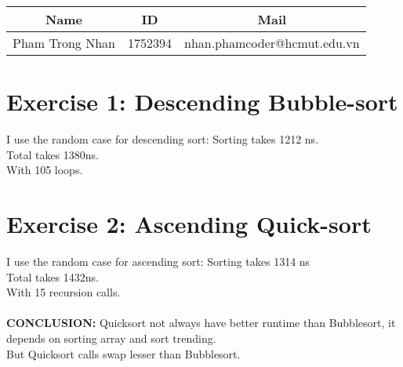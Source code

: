 \documentclass[a4paper, 12pt]{article}
\author{Pham Trong Nhan - 1752394}
\begin{document}
    \begin{tabular}{|c|c|c|}
        \hline
            Name & ID & Mail\\
        \hline
            Pham Trong Nhan & 1752394 & nhan.phamcoder@hcmut.edu.vn\\
        \hline
    \end{tabular}

    \section*{Exercise 1: Descending Bubble-sort}
        I use the random case for descending sort: Sorting takes 1212 ns.\\
        Total takes 1380ns.\\
        With 105 loops.

    \section*{Exercise 2: Ascending Quick-sort}
        I use the random case for ascending sort: Sorting takes 1314 ns\\
        Total takes 1432ns.\\
        With 15 recursion calls.\\\\

    \textbf{CONCLUSION: }Quicksort not always have better runtime than Bubblesort, it depends on sorting array and sort trending.\\
    But Quicksort calls swap lesser than Bubblesort.
\end{document}
